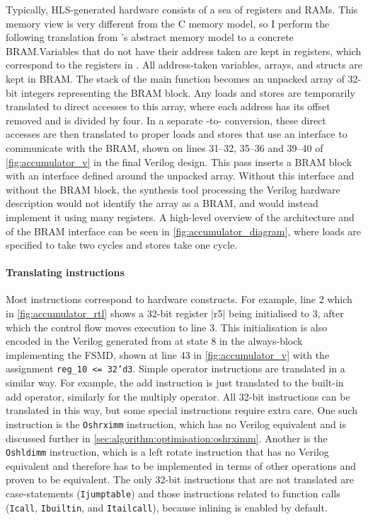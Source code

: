Typically, HLS-generated hardware consists of a sea of registers and RAMs.  This
memory view is very different from the C memory model, so I perform the
following translation from \compcert{}'s abstract memory model to a concrete
\gls{BRAM}.\@ Variables that do not have their address taken are kept in
registers, which correspond to the registers in \rtl{}.  All address-taken
variables, arrays, and structs are kept in \gls{BRAM}.  The stack of the main
function becomes an unpacked array of 32-bit integers representing the
\gls{BRAM} block.  Any loads and stores are temporarily translated to direct
accesses to this array, where each address has its offset removed and is divided
by four.  In a separate \htl{}-to-\htl{} conversion, these direct accesses are
then translated to proper loads and stores that use an interface to communicate
with the \gls{BRAM}, shown on lines 31--32, 35--36 and 39--40 of
\cref{fig:accumulator_v} in the final Verilog design.  This pass inserts a
\gls{BRAM} block with an interface defined around the unpacked array.  Without
this interface and without the \gls{BRAM} block, the synthesis tool processing
the Verilog hardware description would not identify the array as a \gls{BRAM},
and would instead implement it using many registers.  A high-level overview of
the architecture and of the \gls{BRAM} interface can be seen in
\cref{fig:accumulator_diagram}, where loads are specified to take two cycles and
stores take one cycle.

\paragraph{Translating instructions}

Most \rtl{} instructions correspond to hardware constructs.  For example, line 2
which in \cref{fig:accumulator_rtl} shows a 32-bit register \rtlinline|r5| being
initialised to 3, after which the control flow moves execution to line 3. This
initialisation is also encoded in the Verilog generated from \htl{} at state 8
in the always-block implementing the \gls{FSMD}, shown at line 43 in
\cref{fig:accumulator_v} with the assignment \texttt{reg\_10 <= 32'd3}.  Simple
operator instructions are translated in a similar way.  For example, the add
instruction is just translated to the built-in add operator, similarly for the
multiply operator.  All 32-bit instructions can be translated in this way, but
some special instructions require extra care. One such instruction is the
\texttt{Oshrximm} instruction, which has no Verilog equivalent and is discussed
further in \cref{sec:algorithm:optimisation:oshrximm}. Another is the
\texttt{Oshldimm} instruction, which is a left rotate instruction that has no
Verilog equivalent and therefore has to be implemented in terms of other
operations and proven to be equivalent.  The only 32-bit instructions that are
not translated are case-statements (\texttt{Ijumptable}) and those instructions
related to function calls (\texttt{Icall}, \texttt{Ibuiltin}, and
\texttt{Itailcall}), because inlining is enabled by default.

